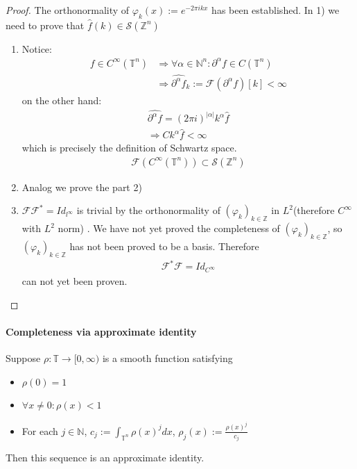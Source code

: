 \begin{proof}
	The orthonormality of $\varphi_k(x):= e^{-2\pi i k x}$ has been established. In 1) we need to prove that $\hat{f}(k) \in \mathcal{S}(\mathbb{Z}^n)$\par 
	\begin{enumerate}
		\item Notice:
		\begin{align*}
			f \in C^\infty(\mathbb{T}^n) &\Rightarrow \forall \alpha \in \mathbb{N}^n:  \partial^\alpha f \in C(\mathbb{T}^n)\\
			&\Rightarrow \widehat{\partial^\alpha f}_k:=  \mathcal{F} (\partial^\alpha f)[k]  < \infty
		\end{align*}
		on the other hand:
		\begin{align*}
			\widehat{\partial^\alpha f} = (2 \pi i )^{|\alpha|} k^\alpha \hat{f}\\
			\Rightarrow C k^\alpha \hat{f} < \infty
		\end{align*}
		which is precisely the definition of Schwartz space.
		\begin{align*}
			\mathcal{F}(C^\infty(\mathbb{T}^n))\subset \mathcal{S}(\mathbb{Z}^n)
		\end{align*}
		\item
		Analog we prove the part 2)
		\item $\mathcal{F} \mathcal{F}^* = Id_{l^\infty}$ is trivial by the orthonormality of $(\varphi_k)_{k \in \mathbb{Z}}$ in $L^2$(therefore $C^\infty$ with $L^2$ norm) . We have not yet proved the completeness of $(\varphi_k)_{k \in \mathbb{Z}}$, so $(\varphi_k)_{k \in \mathbb{Z}}$ has not been proved to be a basis. Therefore 
		\begin{align*}
			\mathcal{F}^* \mathcal{F} = Id_{C^\infty}
		\end{align*}
		can not yet been proven.
	\end{enumerate}
\end{proof}

\paragraph{Completeness via approximate identity}
\begin{lemma}
	Suppose $\rho: \mathbb{T} \rightarrow [0, \infty)$ is a smooth function satisfying
	\begin{itemize}
		\item $\rho(0) = 1$
		\item $\forall x \neq 0: \rho(x) < 1$
		\item For each $j \in \mathbb{N}$, $c_j := \int_{\mathbb{T}^n} \rho(x)^j dx$, $\rho_j(x):= \frac{\rho(x)^j}{c_j}$ 
	\end{itemize}
	Then this sequence is an approximate identity.
\end{lemma}

